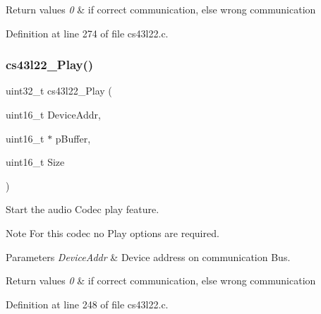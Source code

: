 \begin{DoxyRetVals}{Return values}
{\em 0} & if correct communication, else wrong communication \\
\hline
\end{DoxyRetVals}


Definition at line 274 of file cs43l22.\+c.

\mbox{\label{group___c_s43_l22___exported___functions_ga1a210c3782b3d56db00565d4699f4c89}} 
\subsubsection{\texorpdfstring{cs43l22\+\_\+\+Play()}{cs43l22\_Play()}}
{\footnotesize\ttfamily uint32\+\_\+t cs43l22\+\_\+\+Play (\begin{DoxyParamCaption}\item[{uint16\+\_\+t}]{Device\+Addr,  }\item[{uint16\+\_\+t $\ast$}]{p\+Buffer,  }\item[{uint16\+\_\+t}]{Size }\end{DoxyParamCaption})}



Start the audio Codec play feature. 

\begin{DoxyNote}{Note}
For this codec no Play options are required. 
\end{DoxyNote}

\begin{DoxyParams}{Parameters}
{\em Device\+Addr} & Device address on communication Bus. ~\newline
\\
\hline
\end{DoxyParams}

\begin{DoxyRetVals}{Return values}
{\em 0} & if correct communication, else wrong communication \\
\hline
\end{DoxyRetVals}


Definition at line 248 of file cs43l22.\+c.

\mbox{\label{group___c_s43_l22___exported___functions_gad4e4e8b889500f0e64c546a31d4b6dca}} 
